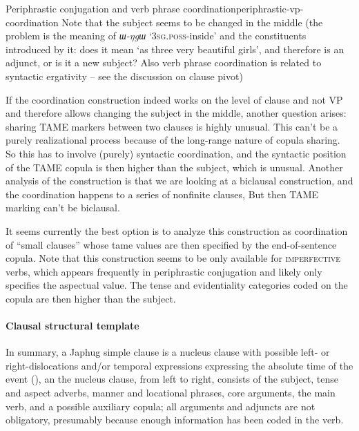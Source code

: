\documentclass[a4paper, oneside, 12pt]{report}
\newcommand{\form}[1]{\emph{#1}}
\newcommand{\category}[1]{\textsc{#1}}
\newcommand{\translate}[1]{`#1'}
\begin{document}
\begin{todobox}{Periphrastic conjugation and verb phrase coordination}{periphrastic-vp-coordination} 
    Note that the subject seems to be changed in the middle 
    (the problem is the meaning of \form{ɯ-ŋgɯ} \translate{\category{3sg.poss}-inside}
    and the constituents introduced by it: 
    does it mean \translate{as three very beautiful girls}, 
    and therefore is an adjunct, or is it a new subject? 
    Also verb phrase coordination is related to syntactic ergativity -- 
    see the discussion on clause pivot)
    
    If the coordination construction indeed works on the level of clause and not VP
    and therefore allows changing the subject in the middle,
    another question arises:
    sharing TAME markers between two clauses is highly unusual.
    This can't be a purely realizational process
    because of the long-range nature of copula sharing.
    So this has to involve (purely) syntactic coordination,
    and the syntactic position of the TAME copula is then higher than the subject,
    which is unusual.
    Another analysis of the construction is that we are looking at a biclausal construction,
    and the coordination happens to a series of nonfinite clauses,
    But then TAME marking can't be biclausal. 
    
    It seems currently the best option is to analyze this construction as coordination of ``small clauses''
    whose \ac{tame} values are then specified by the end-of-sentence copula.
    Note that this construction seems to be only available for \category{imperfective} verbs,
    which appears frequently in periphrastic conjugation
    and likely only specifies the aspectual value. 
    The tense and evidentiality categories coded on the copula are then higher than the subject.
\end{todobox}

\paragraph*{Clausal structural template}
In summary, a Japhug simple clause is a nucleus clause with possible left- or right-dislocations
and/or temporal expressions expressing the absolute time of the event
(),
an the nucleus clause, from left to right,
consists of the subject,
tense and aspect adverbs,
manner and locational phrases,
core arguments, the main verb, and a possible auxiliary copula;
all arguments and adjuncts are not obligatory,
presumably because enough information has been coded in the verb.
\end{document}
